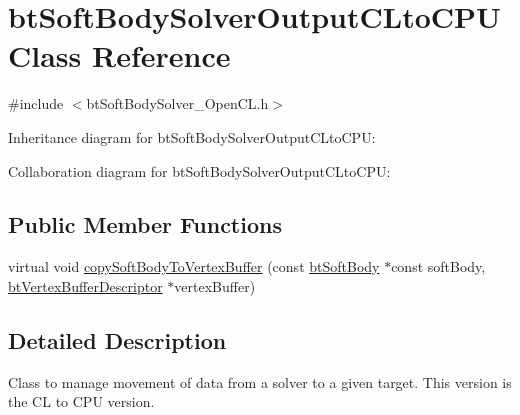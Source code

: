 \hypertarget{classbt_soft_body_solver_output_c_lto_c_p_u}{\section{bt\+Soft\+Body\+Solver\+Output\+C\+Lto\+C\+P\+U Class Reference}
\label{classbt_soft_body_solver_output_c_lto_c_p_u}
}


{\ttfamily \#include $<$bt\+Soft\+Body\+Solver\+\_\+\+Open\+C\+L.\+h$>$}



Inheritance diagram for bt\+Soft\+Body\+Solver\+Output\+C\+Lto\+C\+P\+U\+:


Collaboration diagram for bt\+Soft\+Body\+Solver\+Output\+C\+Lto\+C\+P\+U\+:
\subsection*{Public Member Functions}
\begin{DoxyCompactItemize}
\item 
virtual void \hyperlink{classbt_soft_body_solver_output_c_lto_c_p_u_a2ab37dd740cd08217468e4b9e74d73f5}{copy\+Soft\+Body\+To\+Vertex\+Buffer} (const \hyperlink{classbt_soft_body}{bt\+Soft\+Body} $\ast$const soft\+Body, \hyperlink{classbt_vertex_buffer_descriptor}{bt\+Vertex\+Buffer\+Descriptor} $\ast$vertex\+Buffer)
\end{DoxyCompactItemize}


\subsection{Detailed Description}
Class to manage movement of data from a solver to a given target. This version is the C\+L to C\+P\+U version. 

